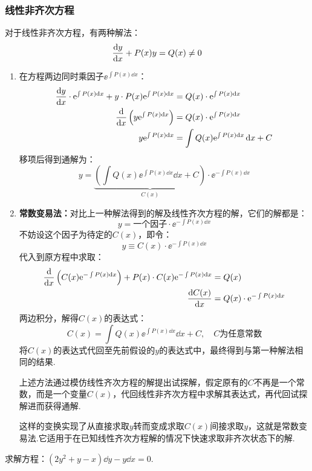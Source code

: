 \subsubsection{线性非齐次方程}
对于线性非齐次方程，有两种解法：
\[\dv{y}{x} + P(x)y = Q(x) \neq 0\]
\begin{enumerate}[solution]
    \item 在方程两边同时乘因子$\ee^{\int P(x)\dd{x}}$：
    \begin{align*}
        \dv{y}{x}\cdot\mathrm{e}^{\int P(x)\dd{x}} + y\cdot P(x)\mathrm{e}^{\int P(x)\dd{x}} &= Q(x)\cdot\mathrm{e}^{\int P(x)\dd{x}}\\
        \dv{}{x}\left(y\mathrm{e}^{\int P(x)\dd{x}}\right) &= Q(x)\cdot\mathrm{e}^{\int P(x)\dd{x}}\\
        y\mathrm{e}^{\int P(x)\dd{x}} &= \int Q(x)\mathrm{e}^{\int P(x)\dd{x}}\dd{x} + C
    \end{align*}
    移项后得到通解为：
    \[y = \underbrace{\left(\int Q(x)\ee^{\int P(x)\dd{x}}\dd{x} + C\right)}_{C(x)}\cdot\ee^{-\int P(x)\dd{x}}\]

    \item \textbf{常数变易法：}对比上一种解法得到的解及线性齐次方程的解，它们的解都是：
    \[y = \text{一个因子} \cdot \ee^{-\int P(x)\dd{x}}\]
    不妨设这个因子为待定的$C(x)$，即令：
    \[y \equiv C(x)\cdot\ee^{-\int P(x)\dd{x}}\]
    代入到原方程中求取：
    \begin{align*}
        \dv{}{x}\left(C(x)\mathrm{e}^{-\int P(x)\dd{x}}\right) + P(x)\cdot C(x)\mathrm{e}^{-\int P(x)\dd{x}} &= Q(x)\\
        \dv{C(x)}{x} &= Q(x) \cdot \mathrm{e}^{-\int P(x)\dd{x}}
    \end{align*}
    两边积分，解得$C(x)$的表达式：
    \[C(x) = \int Q(x)\ee^{\int P(x)\dd{x}}\dd{x} + C,\quad C\text{为任意常数}\]
    将$C(x)$的表达式代回至先前假设的$y$的表达式中，最终得到与第一种解法相同的结果.

    上述方法通过模仿线性齐次方程的解提出试探解，假定原有的$C$不再是一个常数，而是一个变量$C(x)$，代回线性非齐次方程中求解其表达式，再代回试探解进而获得通解.
    
    这样的变换实现了从直接求取$y$转而变成求取$C(x)$间接求取$y$，这就是常数变易法.它适用于在已知线性齐次方程解的情况下快速求取非齐次状态下的解.
\end{enumerate}

\begin{question}
    求解方程：$(2y^2 + y - x)\dd{y} - y\dd{x} = 0$.
\end{question}

